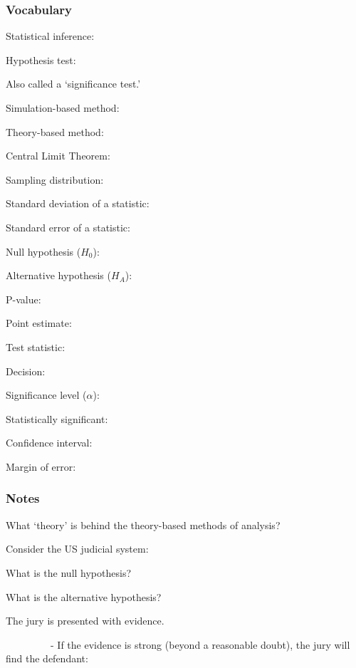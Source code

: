 \documentclass[
]{report}
\newcommand{\rgs}{\vspace{12pt}} %
\newcommand{\rgi}{\hspace{24pt}}  %
\begin{document}

\hypertarget{vocabulary-10}{%
\subsubsection*{Vocabulary}\label{vocabulary-10}}

Statistical inference:
\rgs

Hypothesis test:

\rgi Also called a `significance test.'
\rgs

Simulation-based method:
\rgs

Theory-based method:
\rgs

Central Limit Theorem:
\rgs

Sampling distribution:
\rgs

Standard deviation of a statistic:
\rgs

Standard error of a statistic:
\rgs

Null hypothesis (\(H_0\)):
\rgs

Alternative hypothesis (\(H_A\)):
\rgs

P-value:
\rgs

Point estimate:
\rgs

Test statistic:
\rgs

Decision:
\rgs

Significance level (\(\alpha\)):
\rgs 

Statistically significant:
\rgs

Confidence interval:
\rgs

Margin of error:
\rgs

\hypertarget{notes-15}{%
\subsubsection*{Notes}\label{notes-15}}

What `theory' is behind the theory-based methods of analysis?
\rgs

Consider the US judicial system:

\rgi What is the null hypothesis?
\rgs

\rgi What is the alternative hypothesis?
\rgs

\rgi The jury is presented with evidence.

~~~~~~~~~- If the evidence is strong (beyond a reasonable doubt), the jury will find the defendant:

\rgs
\end{document}
